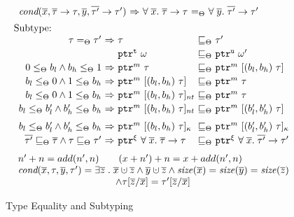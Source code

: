 \begin{DIFnomarkup}
\begin{figure}
{\[\begin{array}{l}
\begin{array}{r@{~}c@{~}l@{~}c@{~}l}
    \textit{cond}(\overline{x},\overline{\tau}\to\tau,\overline{y},\overline{\tau'}\to\tau')

 &\Rightarrow& \tfun{\overline{x}}{\overline{\tau}}{\tau} & 
                         =_{\Theta} & \tfun{\overline{y}}{\overline{\tau'}}{\tau'}\\
    \end{array}
  \\[0.5em]
\text{Subtype:}\\

  \begin{array}{r@{~}c@{~}l@{~}c@{~}l}
    \tau =_{\Theta} \tau'&\Rightarrow&\tau &\sqsubseteq_{\Theta}& \tau'\\[0.2em]
    &&\tptr{\omega}{\tmode} &\sqsubseteq_{\Theta}& \tptr{\omega'}{\umode}\\[0.2em]

    0\le_{\Theta} b_l \wedge b_h \le_{\Theta} 1 &\Rightarrow& \tptr{\tau}{m}&\sqsubseteq_{\Theta}& \tarrayptr{b_l}{b_h}{\tau}{m}\\[0.2em]
    b_l \le_{\Theta} 0 \wedge 1 \le_{\Theta} b_h &\Rightarrow& \tarrayptr{b_l}{b_h}{\tau}{m} &\sqsubseteq_{\Theta}& \tptr{\tau}{m}\\[0.2em]
    b_l \le_{\Theta} 0 \wedge 1 \le_{\Theta} b_h &\Rightarrow& \tntarrayptr{b_l}{b_h}{\tau}{m} &\sqsubseteq_{\Theta}& \tptr{\tau}{m}\\[0.2em]
    b_l \le_{\Theta} b_l' \wedge b_h' \le_{\Theta} b_h &\Rightarrow& \tntarrayptr{b_l}{b_h}{\tau}{m} &\sqsubseteq_{\Theta}& \tarrayptr{b_l'}{b_h'}{\tau}{m}\\[0.6em]
    b_l \le_{\Theta} b_l' \wedge b_h' \le_{\Theta} b_h &\Rightarrow& \tallarrayptr{b_l}{b_h}{\tau}{m} &\sqsubseteq_{\Theta}& \tallarrayptr{b_l'}{b_h'}{\tau}{m}
\\[0.2em]
\overline{\tau'}\sqsubseteq_{\Theta}\overline{\tau}\wedge \tau\sqsubseteq_{\Theta}\tau' &\Rightarrow& \tptr{\tfun{\overline{x}}{\overline{\tau}}{\tau}}{\xi} &\sqsubseteq_{\Theta}& \tptr{\tfun{\overline{x}}{\overline{\tau'}}{\tau'}}{\xi}

    \end{array}
\end{array}
  \]
}
{\footnotesize
\[
\begin{array}{l}
n'+n = add(n',n)
\qquad
(x+n')+n = x+add(n',n)\\
\textit{cond}(\overline{x},\tau,\overline{y},\tau')
=\exists\overline{z}\;.\;\overline{x}\cupdot\overline{z}
  \wedge \overline{y}\cupdot\overline{z}
  \wedge \size(\overline{x})=\size(\overline{y})=\size(\overline{z})
\\\qquad\qquad\qquad\qquad\qquad
  \wedge \tau[\overline{z}/\overline{x}]= \tau'[\overline{z}/\overline{x}]
\end{array}
\]
}
  \caption{Type Equality and Subtyping}
  \label{fig:checkc-subtype}
\end{figure}
\end{DIFnomarkup}

